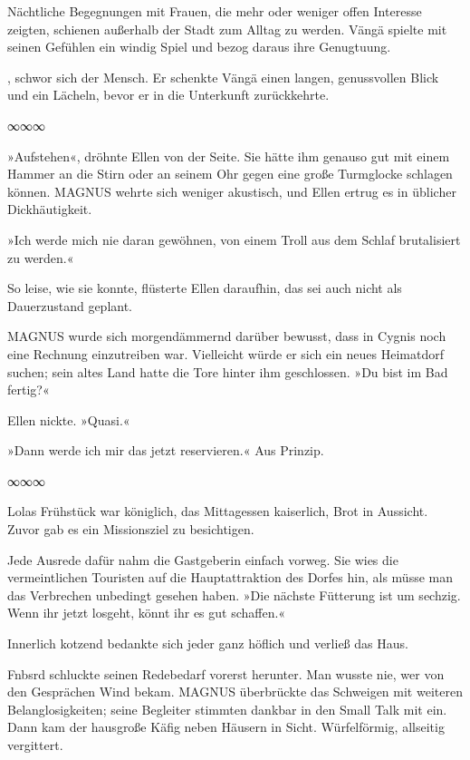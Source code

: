 Nächtliche Begegnungen mit Frauen, die mehr oder weniger offen Interesse zeigten, schienen außerhalb der Stadt zum Alltag zu werden. Vängä spielte mit seinen Gefühlen ein windig Spiel und bezog daraus ihre Genugtuung.

, schwor sich der Mensch. Er schenkte Vängä einen langen, genussvollen Blick und ein Lächeln, bevor er in die Unterkunft zurückkehrte.

\begin{center}
∞∞∞
\end{center}

»Aufstehen«, dröhnte Ellen von der Seite. Sie hätte ihm genauso gut mit einem Hammer an die Stirn oder an seinem Ohr gegen eine große Turmglocke schlagen können. MAGNUS wehrte sich weniger akustisch, und Ellen ertrug es in üblicher Dickhäutigkeit.

»Ich werde mich nie daran gewöhnen, von einem Troll aus dem Schlaf brutalisiert zu werden.«

So leise, wie sie konnte, flüsterte Ellen daraufhin, das sei auch nicht als Dauerzustand geplant.

MAGNUS wurde sich morgendämmernd darüber bewusst, dass in Cygnis noch eine Rechnung einzutreiben war. Vielleicht würde er sich ein neues Heimatdorf suchen; sein altes Land hatte die Tore hinter ihm geschlossen. »Du bist im Bad fertig?«

Ellen nickte. »Quasi.«

»Dann werde ich mir das jetzt reservieren.« Aus Prinzip.

\begin{center}
∞∞∞
\end{center}

Lolas Frühstück war königlich, das Mittagessen kaiserlich, Brot in Aussicht. Zuvor gab es ein Missionsziel zu besichtigen.

Jede Ausrede dafür nahm die Gastgeberin einfach vorweg. Sie wies die vermeintlichen Touristen auf die Hauptattraktion des Dorfes hin, als müsse man das Verbrechen unbedingt gesehen haben. »Die nächste Fütterung ist um sechzig. Wenn ihr jetzt losgeht, könnt ihr es gut schaffen.«

Innerlich kotzend bedankte sich jeder ganz höflich und verließ das Haus.

Fnbsrd schluckte seinen Redebedarf vorerst herunter. Man wusste nie, wer von den Gesprächen Wind bekam. MAGNUS überbrückte das Schweigen mit weiteren Belanglosigkeiten; seine Begleiter stimmten dankbar in den Small Talk mit ein. Dann kam der hausgroße Käfig neben Häusern in Sicht. Würfelförmig, allseitig vergittert.


